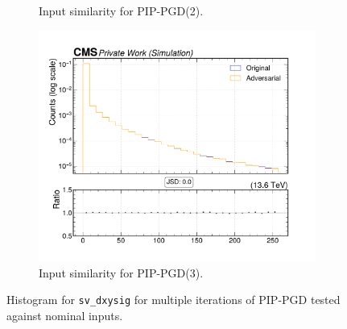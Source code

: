 \begin{figure}[htbp]
\begin{subfigure}[t]{0.32\textwidth}
    \caption*{Input similarity for PIP-PGD(2).}
  \end{subfigure}\hfill
  \begin{subfigure}[t]{0.32\textwidth}
    \includegraphics[width=\linewidth]{media/output/features/compare/combined_it_3/cmp_vtx_arr_sv_dxysig.pdf}
    \caption*{Input similarity for PIP-PGD(3).}
  \end{subfigure}

  \caption*{Histogram for \texttt{sv\_dxysig} for multiple iterations of PIP-PGD tested against nominal inputs.}
  \label{fig:combined_input_sv_dxysig}
\end{figure}


